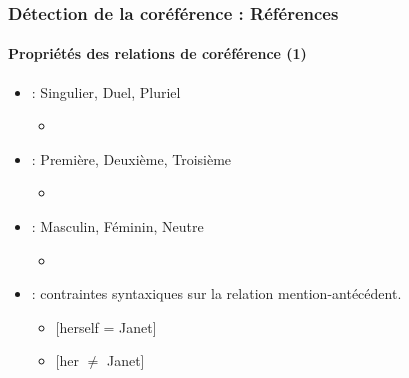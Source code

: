\documentclass[xcolor=table]{beamer}
\begin{document}
\begin{frame}
	\frametitle{Détection de la coréférence : Références}
	\framesubtitle{Propriétés des relations de coréférence (1)}
	
	\begin{itemize}
		\item {} : Singulier, Duel, Pluriel 
		\begin{itemize}
			\item {}
		\end{itemize}
	
		\item {} : Première, Deuxième, Troisième
		\begin{itemize}
			\item {}
		\end{itemize}
		
		\item {} : Masculin, Féminin, Neutre
		\begin{itemize}
			\item {}
		\end{itemize}
		
		\item {} : contraintes syntaxiques sur la relation mention-antécédent.
		\begin{itemize}
			\item {} [herself = Janet]
			\item {} [her $\ne$ Janet]
		\end{itemize}
	
	\end{itemize}
	
\end{frame}
\end{document}
